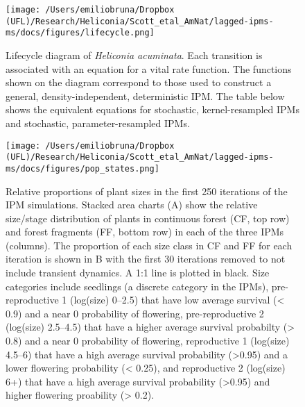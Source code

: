\documentclass[
]{article}
\begin{document}
\newpage

\begin{figure}

{\centering \texttt{[image: /Users/emiliobruna/Dropbox (UFL)/Research/Heliconia/Scott\_etal\_AmNat/lagged-ipms-ms/docs/figures/lifecycle.png]}

}

\caption{Lifecycle diagram of \emph{Heliconia acuminata}. Each
transition is associated with an equation for a vital rate function. The
functions shown on the diagram correspond to those used to construct a
general, density-independent, deterministic IPM. The table below shows
the equivalent equations for stochastic, kernel-resampled IPMs and
stochastic, parameter-resampled IPMs.}

\end{figure}

\newpage

\begin{figure}

{\centering \texttt{[image: /Users/emiliobruna/Dropbox (UFL)/Research/Heliconia/Scott\_etal\_AmNat/lagged-ipms-ms/docs/figures/pop\_states.png]}

}

\caption{Relative proportions of plant sizes in the first 250 iterations
of the IPM simulations. Stacked area charts (A) show the relative
size/stage distribution of plants in continuous forest (CF, top row) and
forest fragments (FF, bottom row) in each of the three IPMs (columns).
The proportion of each size class in CF and FF for each iteration is
shown in B with the first 30 iterations removed to not include transient
dynamics. A 1:1 line is plotted in black. Size categories include
seedlings (a discrete category in the IPMs), pre-reproductive 1
(log(size) 0--2.5) that have low average survival (\textless{} 0.9) and
a near 0 probability of flowering, pre-reproductive 2 (log(size)
2.5--4.5) that have a higher average survival probabilty (\textgreater{}
0.8) and a near 0 probability of flowering, reproductive 1 (log(size)
4.5--6) that have a high average survival probability (\textgreater0.95)
and a lower flowering probability (\textless{} 0.25), and reproductive 2
(log(size) 6+) that have a high average survival probability
(\textgreater0.95) and higher flowering proability (\textgreater{}
0.2).}

\end{figure}

\newpage
\end{document}
